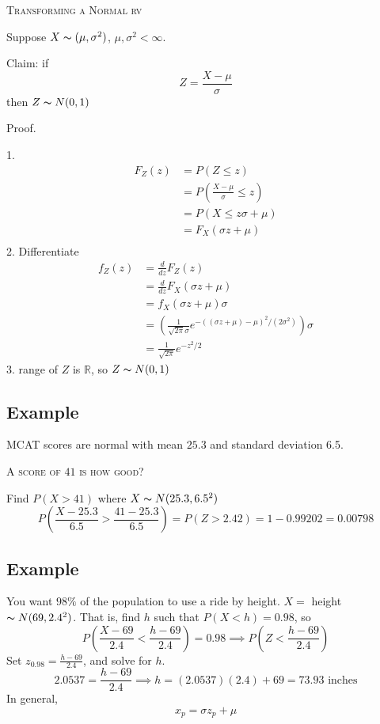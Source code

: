 \textsc{Transforming a Normal rv}

Suppose $ X \thicksim (\mu,\sigma^2) $, $ \mu,\sigma^2<\infty $.

Claim: if
\[ Z=\frac{X-\mu}{\sigma}  \]
then $ Z \thicksim N(0,1) $

Proof.

1.
\begin{align*}
    F_Z(z)&=P(Z\le z)\\
    &=P\left(\frac{X-\mu}{\sigma}\le z\right)\\
    &=P\left(X\le z\sigma + \mu\right)\\
    &=F_X(\sigma z+\mu)\\
\end{align*}
2. Differentiate
\begin{align*}
    f_Z(z)&=\frac{d}{dz}F_Z(z)\\
    &=\frac{d}{dz}F_X(\sigma z+\mu)\\
    &=f_X(\sigma z+\mu)\sigma\\
    &=\left(\frac{1}{\sqrt{2\pi}\sigma}e^{-((\sigma z+\mu)-\mu)^2/(2\sigma^2)}\right)\sigma\\
    &=\frac{1}{\sqrt{2\pi}}e^{-z^2/2}
\end{align*}
3. range of $ Z $ is $ \mathbb{R} $, so $ Z \thicksim N(0,1) $

\subsection{Example}
MCAT scores are normal with mean $ 25.3 $ and standard deviation 6.5.

\textsc{A score of $ 41 $ is how good?}

Find $ P(X>41) $ where $ X \thicksim N(25.3,6.5^2) $
\[ P\left(\frac{X-25.3}{6.5}>\frac{41-25.3}{6.5}\right)=P(Z>2.42)=1-0.99202=0.00798 \]

\subsection{Example}
You want $ 98\% $ of the population to use a ride by height.
$ X= $ height $ \thicksim N(69,2.4^2) $. That is, find $ h $
such that $ P(X<h)=0.98 $, so
\[ P\left(\frac{X-69}{2.4}<\frac{h-69}{2.4}\right)=0.98\implies P\left(Z<\frac{h-69}{2.4}\right)\]
Set $ z_{0.98}= \frac{h-69}{2.4} $, and solve for $ h $.
\[ 2.0537=\frac{h-69}{2.4}\implies h=(2.0537)(2.4)+69=73.93\text{ inches} \]
In general,
\[ x_p=\sigma z_p+\mu \]